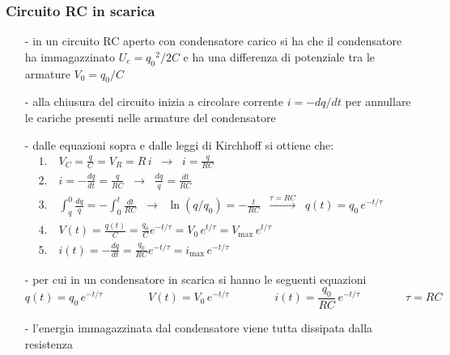 \documentclass[a4paper]{article}
\begin{document}
\subsubsection*{Circuito RC in scarica}
\begin{itemize}[topsep=3pt, itemsep=0pt]
	\item[-] in un circuito RC aperto con condensatore carico si ha che il condensatore ha immagazzinato \(U_e = {q_0}^2 / 2C\) e
	ha una differenza di potenziale tra le armature \(V_0 = q_0/C\)
	\item[-] alla chiusura del circuito inizia a circolare corrente \(i = - dq/dt\) per annullare le cariche presenti nelle armature
	del condensatore
	\item[-] dalle equazioni sopra e dalle leggi di Kirchhoff si ottiene che:
	\begin{align*}
		&1. \quad V_C = \frac{q}{C} = V_R = R \, i \;\;\rightarrow\;\; i = \frac{q}{RC} \\
		&2. \quad i = - \frac{dq}{dt} = \frac{q}{RC} \;\;\rightarrow\;\; \frac{dq}{q} = \frac{dt}{RC} \\
		&3. \quad \int_q^0 \frac{dq}{q} = - \int_0^t \frac{dt}{RC} \;\;\rightarrow\;\; \ln(q/q_0) = -\frac{t}{RC} \;\;\stackrel{\tau = RC}{\rightarrow}\;\; q(t) = q_0 \, e^{-t/\tau} \\
		&4. \quad V(t) = \frac{q(t)}{C} = \frac{q_0}{C} e^{-t/\tau} = V_0 \, e^{t/\tau} = V_\text{max} \, e^{t/\tau} \\
		&5. \quad i(t) = -\frac{dq}{dt} = \frac{q_0}{RC}e^{-t/\tau} = i_\text{max} \, e^{-t/\tau} \qquad\qquad\qquad\qquad\qquad\qquad\qquad\qquad\qquad
	\end{align*}
	\item[-] per cui in un condensatore in scarica si hanno le seguenti equazioni
	\[q(t) = q_0 \, e^{-t/\tau} \qquad \qquad V(t) = V_0 \, e^{-t/\tau} \qquad \qquad i(t) = \frac{q_0}{RC} \, e^{-t/\tau} \qquad \qquad \tau = RC\]
	\item[-] l'energia immagazzinata dal condensatore viene tutta dissipata dalla resistenza
\end{itemize}
\end{document}
